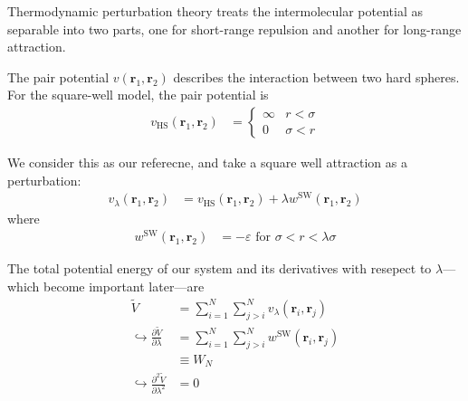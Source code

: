 \documentclass[letterpaper,twocolumn,amsmath,amssymb,prb]{revtex4-1}
\newcommand{\1}{\ensuremath{\textbf{r}_1}}
\newcommand{\2}{\ensuremath{\textbf{r}_2}}
\newcommand{\3}{\ensuremath{\textbf{r}_3}}
\newcommand{\4}{\ensuremath{\textbf{r}_4}}
\begin{document}
Thermodynamic perturbation theory treats the intermolecular potential
as separable into two parts, one for short-range repulsion and another
for long-range attraction.

The pair potential $v(\1,\2)$ describes the interaction between two
hard spheres. For the square-well model, the pair potential is
\begin{align}
  v_\text{HS}(\1,\2) &=
    \begin{cases}
      \infty & r < \sigma \\
      0 & \sigma < r
    \end{cases}
\end{align}

We consider this as our referecne, and take a square well attraction as a perturbation:
\begin{align}
  v_\lambda(\1,\2) &= v_\text{HS}(\1,\2) + \lambda w^\text{SW}(\1,\2) \label{eqn:small-perturbation}
\end{align}
where
\begin{align}
  w^\text{SW}(\1,\2) &= - \varepsilon \text{ for } \sigma < r < \lambda\sigma
\end{align}

The total potential energy of our system and its derivatives with resepect to $\lambda$---which become important later---are
\begin{align}
  \widetilde{V} &= \sum_{i=1}^N\sum_{j>i}^N v_\lambda(\mathbf{r}_i,\mathbf{r}_j) \\ %
  \hookrightarrow \frac{\partial \widetilde{V}}{\partial\lambda} &= \sum_{i=1}^N\sum_{j>i}^N w^\text{SW}(\mathbf{r}_i,\mathbf{r}_j) \nonumber \\
  &\equiv W_N \\
  \hookrightarrow \frac{\partial^2 \widetilde{V}}{\partial\lambda^2} &= 0
\end{align}
\end{document}

